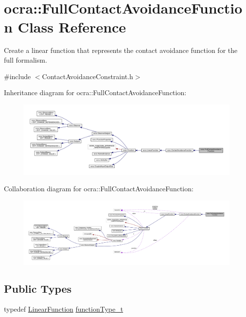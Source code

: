 \hypertarget{classocra_1_1FullContactAvoidanceFunction}{}\section{ocra\+:\+:Full\+Contact\+Avoidance\+Function Class Reference}
\label{classocra_1_1FullContactAvoidanceFunction}


Create a linear function that represents the contact avoidance function for the full formalism.  




{\ttfamily \#include $<$Contact\+Avoidance\+Constraint.\+h$>$}



Inheritance diagram for ocra\+:\+:Full\+Contact\+Avoidance\+Function\+:\nopagebreak
\begin{figure}[H]
\begin{center}
\leavevmode
\includegraphics[width=350pt]{dc/d7e/classocra_1_1FullContactAvoidanceFunction__inherit__graph}
\end{center}
\end{figure}


Collaboration diagram for ocra\+:\+:Full\+Contact\+Avoidance\+Function\+:\nopagebreak
\begin{figure}[H]
\begin{center}
\leavevmode
\includegraphics[width=350pt]{da/dbd/classocra_1_1FullContactAvoidanceFunction__coll__graph}
\end{center}
\end{figure}
\subsection*{Public Types}
\begin{DoxyCompactItemize}
\item 
typedef \hyperlink{classocra_1_1LinearFunction}{Linear\+Function} \hyperlink{classocra_1_1FullContactAvoidanceFunction_a9b59cb139be82095188084893d70b996}{function\+Type\+\_\+t}
\end{DoxyCompactItemize}
